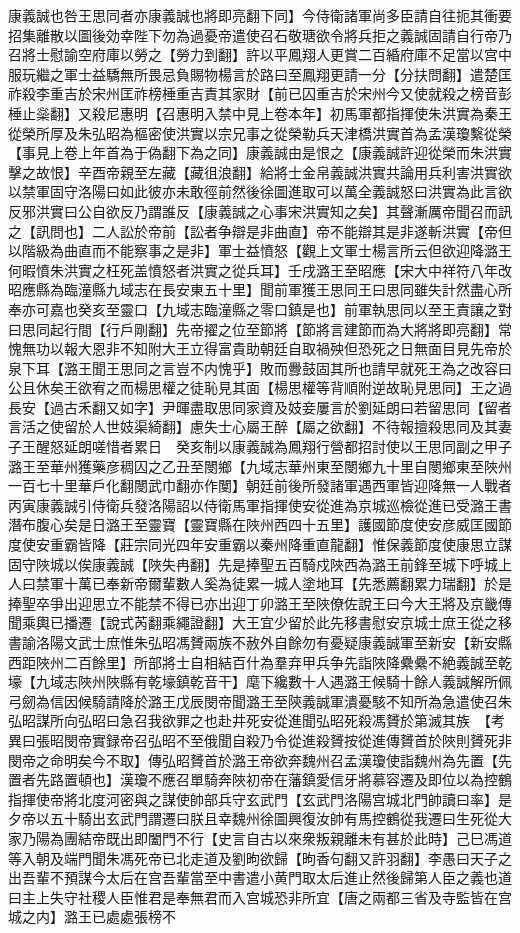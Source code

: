 康義誠也咎王思同者亦康義誠也將即亮翻下同】今侍衛諸軍尚多臣請自往扼其衝要招集離散以圖後効幸陛下勿為過憂帝遣使召石敬瑭欲令將兵拒之義誠固請自行帝乃召將士慰諭空府庫以勞之【勞力到翻】許以平鳳翔人更賞二百緍府庫不足當以宫中服玩繼之軍士益驕無所畏忌負賜物楊言於路曰至鳳翔更請一分【分扶問翻】遣楚匡祚殺李重吉於宋州匡祚榜棰重吉責其家財【前已囚重吉於宋州今又使就殺之榜音彭棰止橤翻】又殺尼惠明【召惠明入禁中見上卷本年】初馬軍都指揮使朱洪實為秦王從榮所厚及朱弘昭為樞密使洪實以宗兄事之從榮勒兵天津橋洪實首為孟漢瓊繫從榮【事見上卷上年首為于偽翻下為之同】康義誠由是恨之【康義誠許迎從榮而朱洪實擊之故恨】辛酉帝親至左藏【藏徂浪翻】給將士金帛義誠洪實共論用兵利害洪實欲以禁軍固守洛陽曰如此彼亦未敢徑前然後徐圖進取可以萬全義誠怒曰洪實為此言欲反邪洪實曰公自欲反乃謂誰反【康義誠之心事宋洪實知之矣】其聲漸厲帝聞召而訊之【訊問也】二人訟於帝前【訟者争辯是非曲直】帝不能辯其是非遂斬洪實【帝但以階級為曲直而不能察事之是非】軍士益憤怒【觀上文軍士楊言所云但欲迎降潞王何暇憤朱洪實之枉死盖憤怒者洪實之從兵耳】壬戌潞王至昭應【宋大中祥符八年改昭應縣為臨潼縣九域志在長安東五十里】聞前軍獲王思同王曰思同雖失計然盡心所奉亦可嘉也癸亥至靈口【九域志臨潼縣之零口鎮是也】前軍執思同以至王責讓之對曰思同起行間【行戶剛翻】先帝擢之位至節將【節將言建節而為大將將即亮翻】常愧無功以報大恩非不知附大王立得富貴助朝廷自取禍殃但恐死之日無面目見先帝於泉下耳【潞王聞王思同之言豈不内愧乎】敗而釁鼓固其所也請早就死王為之改容曰公且休矣王欲宥之而楊思權之徒恥見其面【楊思權等背順附逆故恥見思同】王之過長安【過古禾翻又如字】尹暉盡取思同家資及妓妾屢言於劉延朗曰若留思同【留者言活之使留於人世妓渠綺翻】慮失士心屬王醉【屬之欲翻】不待報擅殺思同及其妻子王醒怒延朗嗟惜者累日　癸亥制以康義誠為鳳翔行營都招討使以王思同副之甲子潞王至華州獲藥彦稠囚之乙丑至閿鄉【九域志華州東至閿鄉九十里自閿鄉東至陜州一百七十里華戶化翻閿武巾翻亦作閺】朝廷前後所發諸軍遇西軍皆迎降無一人戰者丙寅康義誠引侍衛兵發洛陽詔以侍衛馬軍指揮使安從進為京城巡檢從進已受潞王書潛布腹心矣是日潞王至靈寶【靈寶縣在陜州西四十五里】護國節度使安彦威匡國節度使安重霸皆降【莊宗同光四年安重霸以秦州降重直龍翻】惟保義節度使康思立謀固守陜城以俟康義誠【陜失冉翻】先是捧聖五百騎戍陜西為潞王前鋒至城下呼城上人曰禁軍十萬已奉新帝爾輩數人奚為徒累一城人塗地耳【先悉薦翻累力瑞翻】於是捧聖卒爭出迎思立不能禁不得已亦出迎丁卯潞王至陜僚佐說王曰今大王將及京畿傳聞乘輿已播遷【說式芮翻乘繩證翻】大王宜少留於此先移書慰安京城士庶王從之移書諭洛陽文武士庶惟朱弘昭馮贇兩族不赦外自餘勿有憂疑康義誠軍至新安【新安縣西距陜州二百餘里】所部將士自相結百什為羣弃甲兵争先詣陜降纍纍不絶義誠至乾壕【九域志陜州陜縣有乾壕鎮乾音干】麾下纔數十人遇潞王候騎十餘人義誠解所佩弓劒為信因候騎請降於潞王戊辰閔帝聞潞王至陝義誠軍潰憂駭不知所為急遣使召朱弘昭謀所向弘昭曰急召我欲罪之也赴井死安從進聞弘昭死殺馮贇於第滅其族　【考異曰張昭閔帝實録帝召弘昭不至俄聞自殺乃令從進殺贇按從進傳贇首於陜則贇死非閔帝之命明矣今不取】傳弘昭贇首於潞王帝欲奔魏州召孟漢瓊使詣魏州為先置【先置者先路置頓也】漢瓊不應召單騎奔陜初帝在藩鎮愛信牙將慕容遷及即位以為控鶴指揮使帝將北度河密與之謀使帥部兵守玄武門【玄武門洛陽宫城北門帥讀曰率】是夕帝以五十騎出玄武門謂遷曰朕且幸魏州徐圖興復汝帥有馬控鶴從我遷曰生死從大家乃陽為團結帝既出即闔門不行【史言自古以來衆叛親離未有甚於此時】己巳馮道等入朝及端門聞朱馮死帝已北走道及劉昫欲歸【昫香句翻又許羽翻】李愚曰天子之出吾輩不預謀今太后在宫吾輩當至中書遣小黄門取太后進止然後歸第人臣之義也道曰主上失守社稷人臣惟君是奉無君而入宫城恐非所宜【唐之兩都三省及寺監皆在宫城之内】潞王已處處張榜不
